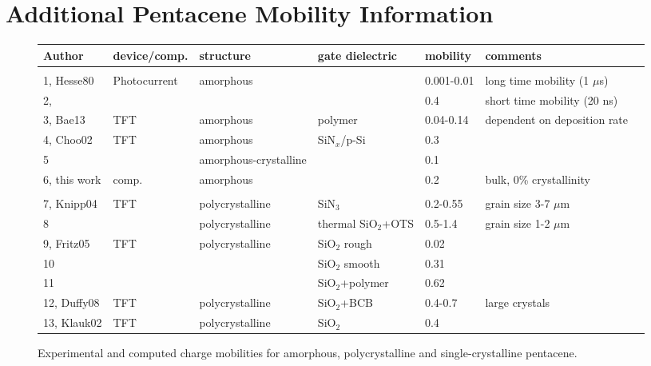 \chapter{Additional Pentacene Mobility Information}
\label{ap:PentTable}
\begin{figure}[htbp]
	\caption{\label{tab:ap:expCompPent}Experimental and computed charge mobilities for amorphous, polycrystalline and single-crystalline pentacene.}
	\label{}
{\footnotesize
\hspace*{-2.8cm}
		\begin{tabular}{lllllll}
			Author & device/comp.  & structure & gate dielectric & mobility & comments  \\
			\hline \\
			1, Hesse80 & Photocurrent  & amorphous &             &  0.001-0.01 & long time mobility (1 $\mu$s)     \\
			2,               &                                                      &                    & & 0.4  & short time mobility (20 ns)   \\
			3, Bae13 & TFT  & amorphous & polymer & 0.04-0.14 & dependent on deposition rate \\
			4, Choo02 & TFT  & amorphous & SiN$_x$/p-Si & 0.3 &  \\
			5              &                             & amorphous-crystalline &  & 0.1 &   \\
			6, this work &   comp.     & amorphous &  & 0.2 &  bulk, 0\% crystallinity \\
			              \hline \\
			7, Knipp04 & TFT  & polycrystalline &  SiN$_3$ & 0.2-0.55 & grain size 3-7 $\mu$m \\
			8                   &         & polycrystalline & thermal SiO$_2$+OTS & 0.5-1.4 & grain size 1-2 $\mu$m \\
			9, Fritz05  & TFT & polycrystalline    & SiO$_2$ rough      & 0.02   & \\
			10                  &        &                             & SiO$_2$ smooth  &  0.31  & \\
			11                  &        &                        &  SiO$_2$+polymer & 0.62 & \\
			12, Duffy08 & TFT & polycrystalline &  SiO$_2$+BCB & 0.4-0.7 & large crystals \\
			13, Klauk02 & TFT & polycrystalline & SiO$_2$ & 0.4 &  \\

\end{tabular}}
\end{figure}

